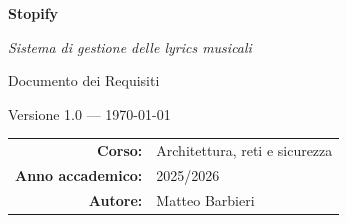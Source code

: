\begin{titlepage}
    \centering
    \vspace*{2cm}

    {\Huge\bfseries Stopify\par}
    \vspace{0.4cm}
    {\Large\itshape Sistema di gestione delle lyrics musicali\par}

    \vspace{1.5cm}

    {\Large Documento dei Requisiti\par}
    \vspace{0.4cm}
    {\small Versione 1.0 --- \today\par}

    \vfill

    \begin{tabular}{rl}
        \textbf{Corso:} & Architettura, reti e sicurezza \\
        \textbf{Anno accademico:} & 2025/2026 \\
        \textbf{Autore:} & Matteo Barbieri \\
    \end{tabular}

    \vspace{2cm}
\end{titlepage}
